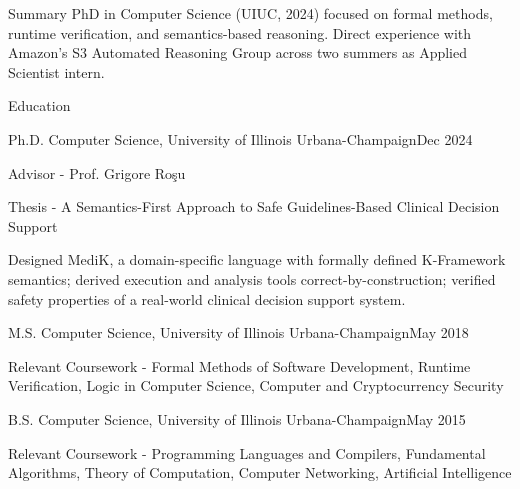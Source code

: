 \documentclass{resume} %
\begin{document}
 

\begin{rSection}{Summary}
  PhD in Computer Science (UIUC, 2024) focused on formal methods, runtime
verification, and semantics-based reasoning. Direct experience with Amazon's S3
Automated Reasoning Group across two summers as Applied Scientist intern.
\end{rSection}

\begin{rSection}{Education}
\begin{rSubsection}{Ph.D. Computer Science, University of Illinois Urbana-Champaign}{Dec 2024}{}{}
\item Advisor - Prof. Grigore Ro\c{s}u
\item Thesis - A Semantics-First Approach to Safe Guidelines-Based Clinical
  Decision Support
\item Designed MediK, a domain-specific language with formally defined
  K-Framework semantics; derived execution and analysis tools
  correct-by-construction; verified safety properties of a real-world clinical
  decision support system.
\end{rSubsection}
\begin{rSubsection}{M.S. Computer Science, University of Illinois Urbana-Champaign}{May 2018}{}{}
\item Relevant Coursework - Formal Methods of Software Development, Runtime Verification, Logic in Computer Science, Computer and Cryptocurrency Security
\end{rSubsection}
\begin{rSubsection}{B.S. Computer Science, University of Illinois Urbana-Champaign}{May 2015}{}{}
\item Relevant Coursework - Programming Languages and Compilers, Fundamental Algorithms, Theory of Computation, Computer Networking, Artificial Intelligence
\end{rSubsection}
\end{rSection}
\end{document}
